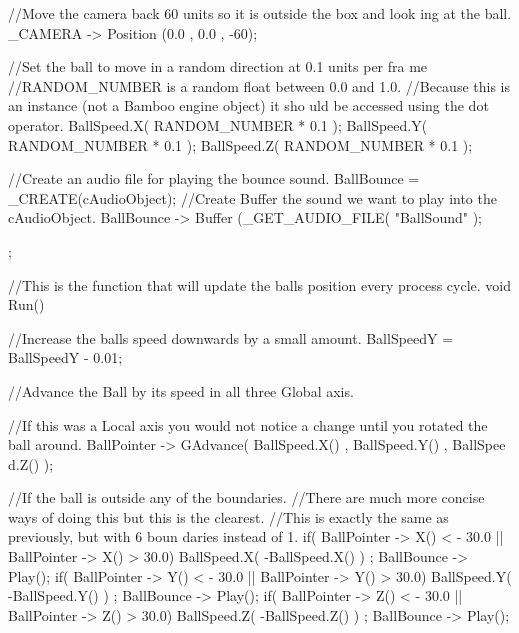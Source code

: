 \begin{DoxyCode}
{{                //Move the camera back 60 units so it is outside the box and look
      ing at the ball.
        _CAMERA -> Position (0.0 , 0.0 , -60);

                //Set the ball to move in a random direction at 0.1 units per fra
      me
                //RANDOM_NUMBER is a random float between 0.0 and 1.0.
                //Because this is an instance (not a Bamboo engine object) it sho
      uld be accessed using the dot operator.
        BallSpeed.X( RANDOM_NUMBER * 0.1 );
        BallSpeed.Y( RANDOM_NUMBER * 0.1 );
        BallSpeed.Z( RANDOM_NUMBER * 0.1 );

        //Create an audio file for playing the bounce sound.
        BallBounce = _CREATE(cAudioObject);
        //Create Buffer the sound we want to play into the cAudioObject.
        BallBounce -> Buffer (_GET_AUDIO_FILE( "BallSound" );

        };

        //This is the function that will update the balls position every process 
      cycle.
        void Run()
        {
                //Increase the balls speed downwards by a small amount.
                BallSpeedY = BallSpeedY - 0.01;

                        //Advance the Ball by its speed in all three Global axis.
      
                        //If this was a Local axis you would not notice a change 
      until you rotated the ball around.
                BallPointer -> GAdvance( BallSpeed.X() , BallSpeed.Y() , BallSpee
      d.Z() );

                        //If the ball is outside any of the boundaries.
                        //There are much more concise ways of doing this but this
       is the clearest.
                        //This is exactly the same as previously, but with 6 boun
      daries instead of 1.
                if( BallPointer -> X()  < - 30.0  || BallPointer -> X() > 30.0)
                {
                        BallSpeed.X( -BallSpeed.X() ) ;
                        BallBounce -> Play();
                }
                if( BallPointer -> Y()  < - 30.0  || BallPointer -> Y() > 30.0)
                {
                        BallSpeed.Y( -BallSpeed.Y() ) ;
                        BallBounce -> Play();
                }
                if( BallPointer -> Z()  < - 30.0  || BallPointer -> Z() > 30.0)
                {
                        BallSpeed.Z( -BallSpeed.Z() ) ;
                        BallBounce -> Play();
                }

}}
\end{DoxyCode}
